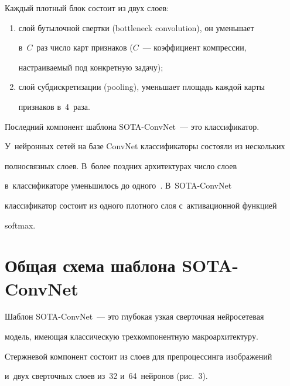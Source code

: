   


  Каждый плотный блок состоит из двух слоев:


  \begin{enumerate}[(1)]


  \item слой бутылочной свертки (bottleneck convolution), он уменьшает 


в~$C$~раз чис\-ло карт признаков ($C$~--- коэффициент компрессии, 


на\-стра\-и\-ва\-емый под конкретную задачу);


  \item  слой субдискретизации (pooling), уменьшает площадь каж\-дой карты 


признаков в~4~раза.


  \end{enumerate}


  


  Последний компонент шаблона SOTA-ConvNet~--- это классификатор. 


У~нейронных сетей на базе ConvNet классификаторы со\-сто\-яли из нескольких 


полносвязных слоев. В~более позд\-них архитектурах чис\-ло слоев 


в~классификаторе уменьшилось до одного~\cite{9-ar}. В~SOTA-ConvNet 


классификатор состоит из одного плот\-но\-го слоя с~активационной функцией 


softmax.


  


\section{Общая схема шаблона SOTA-ConvNet}





  Шаблон SOTA-ConvNet~--- это глубокая узкая сверточная нейросетевая 


модель, име\-ющая классическую трехкомпонентную макроархитектуру.


  


  Стержневой компонент состоит из слоев для препроцессинга изображений 


и~двух сверточных слоев из~32 и~64~нейронов (рис.~3).


  


